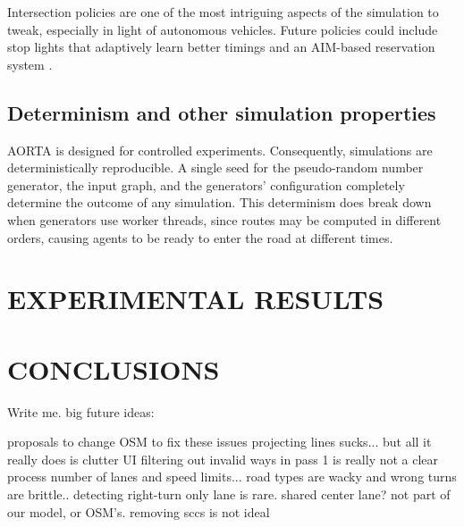 \documentclass[letterpaper, 10 pt, conference]{ieeeconf}  %
\begin{document}


Intersection policies are one of the most intriguing aspects of the simulation to
tweak, especially in light of autonomous vehicles. Future policies could include stop lights that adaptively learn better
timings and an AIM-based reservation system \cite{JAIR08-dresner}.

\subsection{Determinism and other simulation properties}

AORTA is designed for controlled experiments. Consequently, simulations are
deterministically reproducible. A single seed for the pseudo-random number
generator, the input graph, and the generators' configuration completely
determine the outcome of any simulation. This determinism does break down when
generators use worker threads, since routes may be computed in different orders,
causing agents to be ready to enter the road at different times.



 


\section{EXPERIMENTAL RESULTS}



\section{CONCLUSIONS}

Write me. big future ideas:

proposals to change OSM to fix these issues
  projecting lines sucks... but all it really does is clutter UI
  filtering out invalid ways in pass 1 is really not a clear process
  number of lanes and speed limits... road types are wacky and wrong
  turns are brittle.. detecting right-turn only lane is rare. shared center lane?
    not part of our model, or OSM's.
  removing sccs is not ideal
\end{document}
